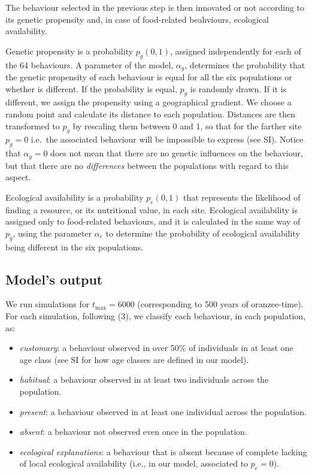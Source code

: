 \documentclass[9pt,twocolumn,twoside,]{pnas-new}
\begin{document}
The behaviour selected in the previous step is then innovated or not
according to its genetic propensity and, in case of food-related
beahviours, ecological availability.

Genetic propensity is a probability \(p_g(0,1)\), assigned independently
for each of the 64 behaviours. A parameter of the model, \(\alpha_g\),
determines the probability that the genetic propensity of each behaviour
is equal for all the six populations or whether is different. If the
probability is equal, \(p_g\) is randomly drawn. If it is different, we
assign the propensity using a geographical gradient. We choose a random
point and calculate its distance to each population. Distances are then
transformed to \(p_g\) by rescaling them between 0 and 1, so that for
the farther site \(p_g=0\) i.e.~the associated behaviour will be
impossible to express (see SI). Notice that \(\alpha_g=0\) does not mean
that there are no genetic influences on the behaviour, but that there
are no \emph{differences} between the populations with regard to this
aspect.

Ecological availability is a probability \(p_e(0,1)\) that represents
the likelihood of finding a resource, or its nutritional value, in each
site. Ecological availability is assigned only to food-related
behaviours, and it is calculated in the same way of \(p_g\), using the
parameter \(\alpha_e\) to determine the probability of ecological
availability being different in the six populations.

\subsection*{Model's output}\label{format}

We run simulations for \(t_\text{max}=6000\) (corresponding to 500 years
of oranzee-time). For each simulation, following (3), we classify each
behaviour, in each population, as:

\begin{itemize}
\item
  \emph{customary}: a behaviour observed in over 50\% of individuals in
  at least one age class (see SI for how age classes are defined in our
  model).
\item
  \emph{habitual}: a behaviour observed in at least two individuals
  across the population.
\item
  \emph{present}: a behaviour observed in at least one individual across
  the population.
\item
  \emph{absent}: a behaviour not observed even once in the population.
\item
  \emph{ecological explanations}: a behaviour that is absent because of
  complete lacking of local ecological availability (i.e., in our model,
  associated to \(p_e=0\)).
\end{itemize}
\end{document}

